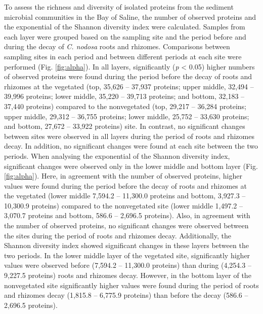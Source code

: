\documentclass[
  12 pt,
]{article}
\begin{document}
To assess the richness and diversity of isolated proteins from the sediment microbial communities in the Bay of Saline, the number of observed proteins and the exponential of the Shannon diversity index were calculated. Samples from each layer were grouped based on the sampling site and the period before and during the decay of \emph{C. nodosa} roots and rhizomes. Comparisons between sampling sites in each period and between different periods at each site were performed (Fig. \ref{fig:alpha}). In all layers, significantly (\emph{p} \textless{} 0.05) higher numbers of observed proteins were found during the period before the decay of roots and rhizomes at the vegetated (top, 35,626 -- 37,937 proteins; upper middle, 32,494 -- 39,996 proteins; lower middle, 35,220 -- 39,713 proteins; and bottom, 32,183 -- 37,440 proteins) compared to the nonvegetated (top, 29,217 -- 36,284 proteins; upper middle, 29,312 -- 36,755 proteins; lower middle, 25,752 -- 33,630 proteins; and bottom, 27,672 -- 33,922 proteins) site. In contrast, no significant changes between sites were observed in all layers during the period of roots and rhizomes decay. In addition, no significant changes were found at each site between the two periods. When analysing the exponential of the Shannon diversity index, significant changes were observed only in the lower middle and bottom layer (Fig. \ref{fig:alpha}). Here, in agreement with the number of observed proteins, higher values were found during the period before the decay of roots and rhizomes at the vegetated (lower middle 7,594.2 -- 11,300.0 proteins and bottom, 3,927.3 -- 10,300.9 proteins) compared to the nonvegetated site (lower middle 1,497.2 -- 3,070.7 proteins and bottom, 586.6 -- 2,696.5 proteins). Also, in agreement with the number of observed proteins, no significant changes were observed between the sites during the period of roots and rhizomes decay. Additionally, the Shannon diversity index showed significant changes in these layers between the two periods. In the lower middle layer of the vegetated site, significantly higher values were observed before (7,594.2 -- 11,300.0 proteins) than during (4,254.3 -- 9,227.5 proteins) roots and rhizomes decay. However, in the bottom layer of the nonvegetated site significantly higher values were found during the period of roots and rhizomes decay (1,815.8 -- 6,775.9 proteins) than before the decay (586.6 -- 2,696.5 proteins).
\end{document}
